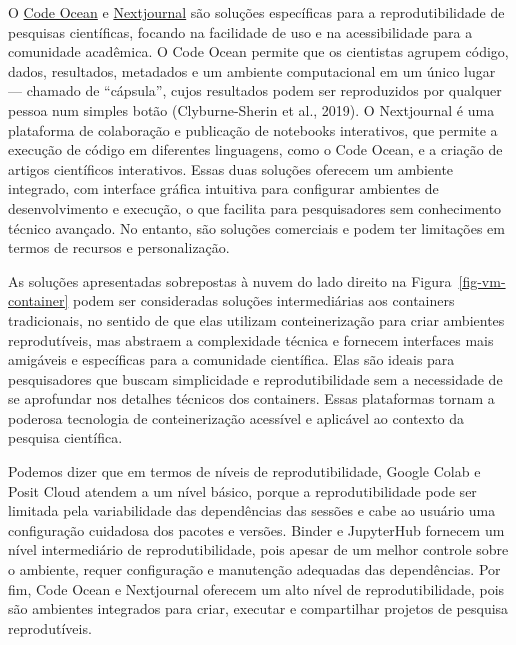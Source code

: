 \documentclass[
  a4paper,
]{book}
\begin{document}
O \href{https://codeocean.com/}{Code Ocean} e
\href{https://nextjournal.com/}{Nextjournal} são soluções específicas
para a reprodutibilidade de pesquisas científicas, focando na facilidade
de uso e na acessibilidade para a comunidade acadêmica. O Code Ocean
permite que os cientistas agrupem código, dados, resultados, metadados e
um ambiente computacional em um único lugar --- chamado de ``cápsula'',
cujos resultados podem ser reproduzidos por qualquer pessoa num simples
botão (Clyburne-Sherin et al., 2019). O Nextjournal é uma plataforma de
colaboração e publicação de notebooks interativos, que permite a
execução de código em diferentes linguagens, como o Code Ocean, e a
criação de artigos científicos interativos. Essas duas soluções oferecem
um ambiente integrado, com interface gráfica intuitiva para configurar
ambientes de desenvolvimento e execução, o que facilita para
pesquisadores sem conhecimento técnico avançado. No entanto, são
soluções comerciais e podem ter limitações em termos de recursos e
personalização.

As soluções apresentadas sobrepostas à nuvem do lado direito na
Figura~\ref{fig-vm-container} podem ser consideradas soluções
intermediárias aos containers tradicionais, no sentido de que elas
utilizam conteinerização para criar ambientes reprodutíveis, mas
abstraem a complexidade técnica e fornecem interfaces mais amigáveis e
específicas para a comunidade científica. Elas são ideais para
pesquisadores que buscam simplicidade e reprodutibilidade sem a
necessidade de se aprofundar nos detalhes técnicos dos containers. Essas
plataformas tornam a poderosa tecnologia de conteinerização acessível e
aplicável ao contexto da pesquisa científica.

Podemos dizer que em termos de níveis de reprodutibilidade, Google Colab
e Posit Cloud atendem a um nível básico, porque a reprodutibilidade pode
ser limitada pela variabilidade das dependências das sessões e cabe ao
usuário uma configuração cuidadosa dos pacotes e versões. Binder e
JupyterHub fornecem um nível intermediário de reprodutibilidade, pois
apesar de um melhor controle sobre o ambiente, requer configuração e
manutenção adequadas das dependências. Por fim, Code Ocean e Nextjournal
oferecem um alto nível de reprodutibilidade, pois são ambientes
integrados para criar, executar e compartilhar projetos de pesquisa
reprodutíveis.
\end{document}
